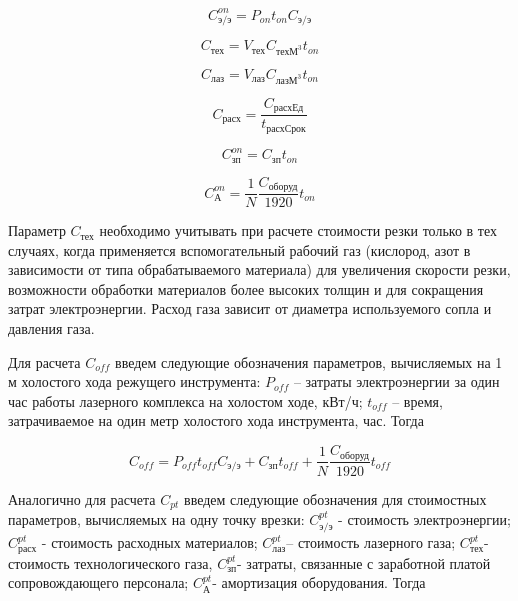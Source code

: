 \documentclass{article}
\begin{document}
\begin{equation}
  C_\text{э/э}^{on} =
  P_{on} t_{on}   C_\text{э/э}
  \label{c-on-ee}
\end{equation}

\begin{equation}
  C_\text{тех} =
  V_\text{тех} C_{\text{техМ}^3} t_{on}
  \label{c-on-teh}
\end{equation}

\begin{equation}
  C_\text{лаз} =
  V_\text{лаз} C_{\text{лазМ}^3} t_{on}
  \label{c-on-laz}
\end{equation}

\begin{equation}
  C_\text{расх} =
  \frac{C_\text{расхЕд}}{t_\text{расхСрок}}
  \label{c-on-rasx}
\end{equation}

\begin{equation}
  C_\text{зп}^{on} =
  C_\text{зп} t_{on}
  \label{c-on-zp}
\end{equation}

\begin{equation}
  C_\text{А}^{on} =
  \frac{1}N \frac{C_\text{оборуд}}{1920} t_{on}
  \label{c-on-A}
\end{equation}

Параметр
$C_\text{тех}$
необходимо учитывать при расчете стоимости резки
только в тех случаях,
когда применяется вспомогательный рабочий газ
(кислород, азот в зависимости от типа обрабатываемого материала)
для увеличения скорости резки,
возможности обработки материалов более высоких толщин
и для сокращения затрат электроэнергии.
Расход газа зависит от диаметра используемого сопла и давления газа.

Для расчета
$C_{off}$
введем следующие обозначения параметров,
вычисляемых на 1 м холостого хода режущего инструмента:
$P_{off}$ – затраты электроэнергии за один час работы лазерного комплекса на холостом ходе, кВт/ч;
$t_{off}$ – время, затрачиваемое на один метр холостого хода инструмента, час.
Тогда

\begin{equation}
  C_{off} =
  P_{off} t_{off} C_\text{э/э}
  + C_\text{зп} t_{off}
  + \frac{1}N \frac{C_\text{оборуд}}{1920} t_{off}
  \label{c-off}
\end{equation}

Аналогично для расчета
$C_{pt}$
введем следующие обозначения для стоимостных параметров,
вычисляемых на одну точку врезки:
$C_\text{э/э}^{pt}$ - стоимость электроэнергии;
$C_\text{расх}^{pt}$ - стоимость расходных материалов;
$C_\text{лаз}^{pt}$– стоимость лазерного газа;
$C_\text{тех}^{pt}$- стоимость технологического газа,
$C_\text{зп}^{pt}$- затраты, связанные с заработной платой сопровождающего персонала;
$C_\text{А}^{pt}$- амортизация оборудования.
Тогда
\end{document}
